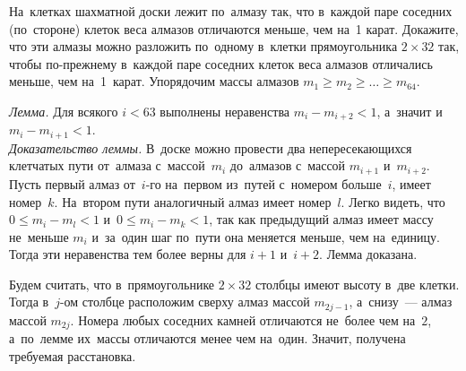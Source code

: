 \problem
На~клетках шахматной доски лежит по~алмазу так, что в~каждой паре соседних
(по~стороне) клеток веса алмазов отличаются меньше, чем на~1 карат.
Докажите, что эти алмазы можно разложить по~одному в~клетки прямоугольника
$2 \times 32$ так, чтобы по-прежнему в~каждой паре соседних клеток веса алмазов
отличались меньше, чем на~1~карат.
\solution
Упорядочим массы алмазов $m_1 \geqslant m_2 \geqslant \ldots \geqslant m_{64}$.
\par
\emph{Лемма.}
Для всякого $i < 63$ выполнены неравенства $m_i - m_{i+2} < 1$, а~значит
и~$m_{i} - m_{i+1} < 1$.
\\\emph{Доказательство леммы.}
В~доске можно провести два непересекающихся клетчатых пути от~алмаза
с~массой~$m_i$ до~алмазов с~массой $m_{i+1}$ и~$m_{i+2}$.
Пусть первый алмаз от~$i$-го на~первом из~путей с~номером больше~$i$, имеет
номер~$k$.
На~втором пути аналогичный алмаз имеет номер~$l$.
Легко видеть, что $0 \leq m_i - m_l < 1$ и~$0 \leq m_i - m_k < 1$, так как
предыдущий алмаз имеет массу не~меньше $m_i$ и~за~один шаг по~пути она меняется
меньше, чем на~единицу.
Тогда эти неравенства тем более верны для $i + 1$ и~$i + 2$.
Лемма доказана.
\par
Будем считать, что в~прямоугольнике $2 \times 32$ столбцы имеют высоту в~две
клетки.
Тогда в~$j$-ом столбце расположим сверху алмаз массой $m_{2j-1}$, а~снизу~---
алмаз массой $m_{2j}$.
Номера любых соседних камней отличаются не~более чем на~$2$, а~по~лемме
их~массы отличаются менее чем на~один.
Значит, получена требуемая расстановка.
\endproblem
